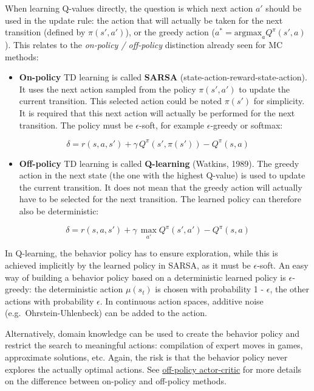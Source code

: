 \documentclass[
  letterpaper,
  DIV=11,
  numbers=noendperiod]{scrreprt}
\providecommand{\tightlist}{%
  \setlength{\itemsep}{0pt}\setlength{\parskip}{0pt}}\usepackage{longtable,booktabs,array}
\begin{document}
When learning Q-values directly, the question is which next action
\(a'\) should be used in the update rule: the action that will actually
be taken for the next transition (defined by \(\pi(s', a')\)), or the
greedy action (\(a^* = \text{argmax}_a Q^\pi(s', a)\)). This relates to
the \emph{on-policy / off-policy} distinction already seen for MC
methods:

\begin{itemize}
\tightlist
\item
  \textbf{On-policy} TD learning is called \textbf{SARSA}
  (state-action-reward-state-action). It uses the next action sampled
  from the policy \(\pi(s', a')\) to update the current transition. This
  selected action could be noted \(\pi(s')\) for simplicity. It is
  required that this next action will actually be performed for the next
  transition. The policy must be \(\epsilon\)-soft, for example
  \(\epsilon\)-greedy or softmax:
\end{itemize}

\[
    \delta = r(s, a, s') + \gamma \, Q^\pi(s', \pi(s')) - Q^\pi(s, a)
\]

\begin{itemize}
\tightlist
\item
  \textbf{Off-policy} TD learning is called \textbf{Q-learning}
  (Watkins, 1989). The greedy action in the next state (the one with the
  highest Q-value) is used to update the current transition. It does not
  mean that the greedy action will actually have to be selected for the
  next transition. The learned policy can therefore also be
  deterministic:
\end{itemize}

\[
    \delta = r(s, a, s') + \gamma \, \max_{a'} Q^\pi(s', a') - Q^\pi(s, a)
\]

In Q-learning, the behavior policy has to ensure exploration, while this
is achieved implicitly by the learned policy in SARSA, as it must be
\(\epsilon\)-soft. An easy way of building a behavior policy based on a
deterministic learned policy is \(\epsilon\)-greedy: the deterministic
action \(\mu(s_t)\) is chosen with probability 1 - \(\epsilon\), the
other actions with probability \(\epsilon\). In continuous action
spaces, additive noise (e.g.~Ohrstein-Uhlenbeck) can be added to the
action.

Alternatively, domain knowledge can be used to create the behavior
policy and restrict the search to meaningful actions: compilation of
expert moves in games, approximate solutions, etc. Again, the risk is
that the behavior policy never explores the actually optimal actions.
See \protect\hyperlink{off-policy-actor-critic}{off-policy actor-critic}
for more details on the difference between on-policy and off-policy
methods.
\end{document}
